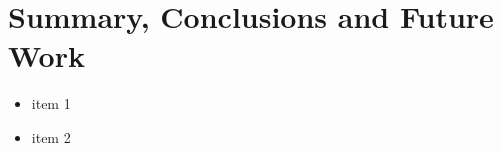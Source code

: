 \chapter{Summary, Conclusions and Future Work}

\begin{itemize}
\item item 1
\item item 2
\end{itemize}

